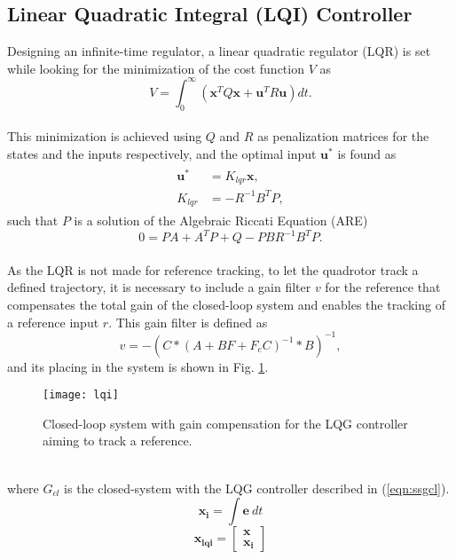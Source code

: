 \subsection{Linear Quadratic Integral (LQI) Controller}
Designing an infinite-time regulator, a linear quadratic regulator (LQR) is set while looking for the minimization of the cost function $V$ as
	\begin{equation}
	V = \int_{0}^{\infty}(\mathbf{x}^{T}Q\mathbf{x} + \mathbf{u}^{T}R\mathbf{u}) dt.
	\end{equation}
\\This minimization is achieved using $Q$ and $R$ as penalization matrices for the states and the inputs respectively, and the optimal input $\mathbf{u}^{*}$ is found as
\begin{align}
\begin{split}
\mathbf{u}^{*}&= K_{lqr}\mathbf{x},\\
K_{lqr} &= -R^{-1}B^{T}P,
\end{split}
\end{align}
such that $P$ is a solution of the Algebraic Riccati Equation (ARE) \cite{RobustWerner2013}
	\begin{equation}
	0 = PA + A^{T}P + Q - PBR^{-1}B^{T}P.
	\end{equation}
\\As the LQR is not made for reference tracking, to let the quadrotor track a defined trajectory, it is necessary to include a gain filter $v$ for the reference that compensates the total gain of the closed-loop system and enables the tracking of a reference input $r$. This gain filter is defined as
	\begin{equation}\label{eqn:v}
	v = -(C*(A+BF+F_{e}C)^{-1}*B)^{-1},
	\end{equation}
and its placing in the system is shown in Fig. \ref{fig:lqi}.
	\begin{figure}[h]
	\begin{center}
	\texttt{[image: lqi]}
	\caption{Closed-loop system with gain compensation for the LQG controller aiming to track a reference.}
	\label{fig:lqi}
	\end{center}
	\end{figure}
\\where $G_{cl}$ is the closed-system with the LQG controller described in (\ref{eqn:ssgcl}).
\begin{equation}
\mathbf{x_i} = \int \mathbf{e}\ dt
\end{equation}
\begin{equation}
\mathbf{x_{lqi}} = \begin{bmatrix}
\mathbf{x} \\
\mathbf{x_i}
\end{bmatrix}
\end{equation}


